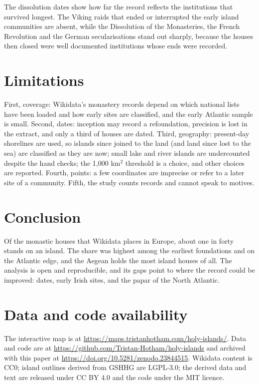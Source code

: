 \documentclass[11pt,a4paper]{article}
\begin{document}
The dissolution dates show how far the record reflects the institutions that survived longest. The Viking raids that ended or interrupted the early island communities are absent, while the Dissolution of the Monasteries, the French Revolution and the German secularisations stand out sharply, because the houses then closed were well documented institutions whose ends were recorded.

\section{Limitations}
First, coverage: Wikidata's monastery records depend on which national lists have been loaded and how early sites are classified, and the early Atlantic sample is small. Second, dates: inception may record a refoundation, precision is lost in the extract, and only a third of houses are dated. Third, geography: present-day shorelines are used, so islands since joined to the land (and land since lost to the sea) are classified as they are now; small lake and river islands are undercounted despite the hand checks; the 1,000 km$^2$ threshold is a choice, and other choices are reported. Fourth, points: a few coordinates are imprecise or refer to a later site of a community. Fifth, the study counts records and cannot speak to motives.

\section{Conclusion}
Of the monastic houses that Wikidata places in Europe, about one in forty stands on an island. The share was highest among the earliest foundations and on the Atlantic edge, and the Aegean holds the most island houses of all. The analysis is open and reproducible, and its gaps point to where the record could be improved: dates, early Irish sites, and the papar of the North Atlantic.

\section*{Data and code availability}
The interactive map is at \url{https://maps.tristanhotham.com/holy-islands/}. Data and code are at \url{https://github.com/Tristan-Hotham/holy-islands} and archived with this paper at \url{https://doi.org/10.5281/zenodo.23844515}. Wikidata content is CC0; island outlines derived from GSHHG are LGPL-3.0; the derived data and text are released under CC BY 4.0 and the code under the MIT licence.
\end{document}
